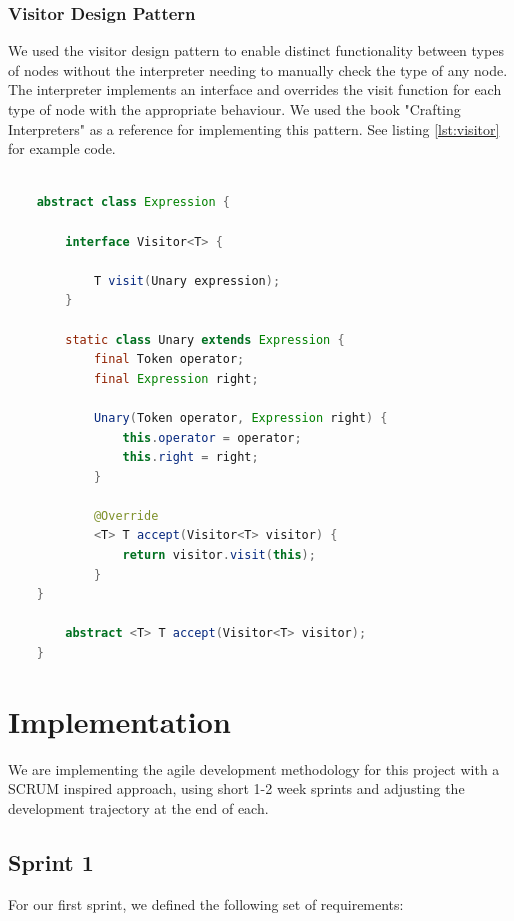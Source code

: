 \documentclass[a4paper, oneside, 11pt]{report}
\begin{document}
\subsection{Visitor Design Pattern}

We used the visitor design pattern to enable distinct functionality between types of nodes
without the interpreter needing to manually check the type of any node.
The interpreter implements an interface and overrides the visit function for each type of node with 
the appropriate behaviour. We used the book "Crafting Interpreters" \cite{nystrom:2021} as a reference for 
implementing this pattern.
See listing \ref{lst:visitor} for example code.

\begin{lstlisting}[caption = {An example of the implementation of a node---the unary expression in this case}, label = {lst:visitor}, language = Java, breaklines=true, showstringspaces=false, tabsize=2] 

	abstract class Expression {

		interface Visitor<T> {

			T visit(Unary expression);
		}

		static class Unary extends Expression {
			final Token operator;
			final Expression right;

			Unary(Token operator, Expression right) {
				this.operator = operator;
				this.right = right;
			}

			@Override
			<T> T accept(Visitor<T> visitor) {
				return visitor.visit(this);
			}
	}

		abstract <T> T accept(Visitor<T> visitor);
	}
\end{lstlisting}





\chapter{Implementation}\label{Impl}

We are implementing the agile development methodology for this project with a SCRUM inspired approach, using short 1-2 week sprints and adjusting the development trajectory at the end of each.

\section{Sprint 1}

For our first sprint, we defined the following set of requirements: 
\end{document}
